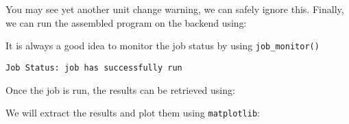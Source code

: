 \leavevmode{}%
You may see yet another unit change warning, we can safely ignore this.
Finally, we can run the assembled program on the backend using:

\hypertarget{ed65f46e-f38e-47ee-b973-d2f110666583}{}
\begin{Shaded}
\begin{Highlighting}[]
\OperatorTok{=} 

\OperatorTok{=}
\OperatorTok{=}\NormalTok{, }
\OperatorTok{=}\NormalTok{, }
\OperatorTok{=}
\end{Highlighting}
\end{Shaded}

\leavevmode{}%
It is always a good idea to monitor the job status by using
\texttt{job\_monitor()}

\hypertarget{4f1aa3f2-59f1-403d-9742-42897deb0deb}{}
\begin{Shaded}
\begin{Highlighting}[]
\end{Highlighting}
\end{Shaded}

\begin{verbatim}
Job Status: job has successfully run
\end{verbatim}

\leavevmode{}%
Once the job is run, the results can be retrieved using:

\hypertarget{6350f277-6624-4758-8df3-13b6cea23cad}{}
\begin{Shaded}
\begin{Highlighting}[]
\OperatorTok{=}\OperatorTok{=}\NormalTok{) }
\end{Highlighting}
\end{Shaded}

\leavevmode{}%
We will extract the results and plot them using \texttt{matplotlib}:

